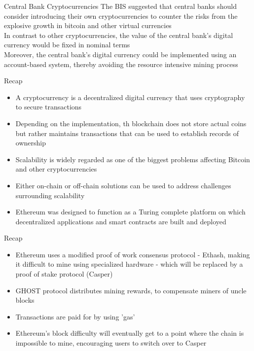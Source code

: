 \documentclass[11pt]{beamer}
\begin{document}

\begin{frame}{Central Bank Cryptocurrencies}
	The BIS suggested that central banks should consider introducing their own cryptocurrencies to counter the risks from the explosive growth in bitcoin and other virtual currencies\\ \vspace{3mm}
	In contrast to other cryptocurrencies, the value of the central bank's digital currency would be fixed in nominal terms\\ \vspace{3mm}
	Moreover, the central bank's digital currency could be implemented using an account-based system, thereby avoiding the resource intensive mining process
\end{frame}


\begin{frame}{Recap}
	\begin{itemize}
		\item A cryptocurrency is a decentralized digital currency that uses cryptography to secure transactions
		\item Depending on the implementation, th blockchain does not store actual coins but rather maintains transactions that can be used to establish records of ownership
		\item Scalability is widely regarded as one of the biggest problems affecting Bitcoin and other cryptocurrencies
		\item Either on-chain or off-chain solutions can be used to address challenges surrounding scalability
		\item Ethereum was designed to function as a Turing complete platform on which decentralized applications and smart contracts are built and deployed
	\end{itemize}
\end{frame}


\begin{frame}{Recap}
	\begin{itemize}
		\item Ethereum uses a modified proof of work consensus protocol - Ethash, making it difficult to mine using specialized hardware - which will be replaced by a proof of stake protocol (Casper)
		\item GHOST protocol distributes mining rewards, to compensate miners of uncle blocks
		\item Transactions are paid for by using 'gas'
		\item Ethereum's block difficulty will eventually get to a point where the chain is impossible to mine, encouraging users to switch over to Casper
	\end{itemize}
\end{frame}
\end{document}
